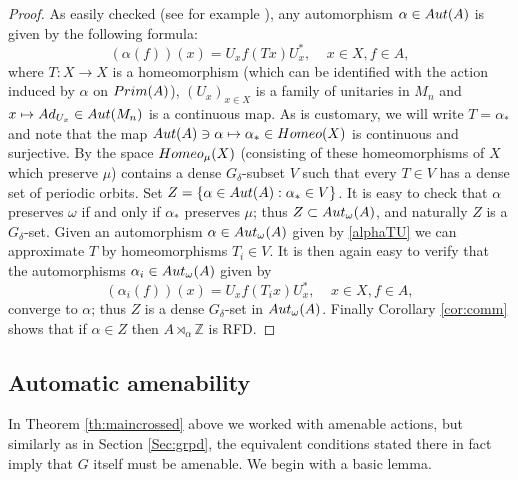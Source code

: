 \documentclass[11 pt, leqno, hidelinks]{amsart}%
\theoremstyle{plain}
\numberwithin{equation}{section}
\newcommand{\Z}{\mathbb{Z}}
\newcommand{\Prim}{\textup{Prim}}
\begin{document}
\begin{proof}
As easily checked (see for example \cite[Sections 4,5]{DanaIan}), any automorphism $\alpha \in \textup{Aut}(A)$ is given by the following formula:
 \begin{equation} \label{alphaTU} (\alpha(f)) (x)  = U_x f(Tx) U_x^*, \;\;\;\; x \in X, f \in A, \end{equation}
where $T:X \to X$ is a homeomorphism (which can be identified with the action induced by $\alpha$ on $\Prim(A)$), $(U_x)_{x\in X}$ is a family of unitaries in $M_n$  and $x \mapsto Ad_{U_x} \in \textup{Aut}(M_n)$ is a continuous map. As is customary, we will write $T= \alpha_*$ and note that the map $\textup{Aut}(A) \ni \alpha \mapsto \alpha_* \in \textup{Homeo}(X)$ is continuous and surjective. By \cite{DF} the space $\textup{Homeo}_\mu(X)$ (consisting of these homeomorphisms of $X$ which preserve $\mu$) contains a dense $G_\delta$-subset $V$ such that every $T\in V$ has a dense set of periodic orbits. Set $Z=\{\alpha \in \textup{Aut}(A): \alpha_*\in V\}$.
It is easy to check that $\alpha$ preserves $\omega$ if and only if $\alpha_*$ preserves $\mu$; thus $Z\subset \textup{Aut}_\omega(A)$, and naturally $Z$ is a $G_\delta$-set.   Given an automorphism $\alpha\in \textup{Aut}_\omega(A)$ given by  \eqref{alphaTU} we can approximate $T$ by homeomorphisms $T_i \in V$. It is then again easy to verify that the automorphisms $\alpha_i\in \textup{Aut}_\omega(A)$ given by
 \[(\alpha_i(f)) (x)  = U_x f(T_ix) U_x^*, \;\;\;\; x \in X, f \in A, \]
converge to $\alpha$; thus $Z$ is a dense $G_\delta$-set in  $\textup{Aut}_\omega(A)$. Finally Corollary \ref{cor:comm} shows that if $\alpha \in Z$ then
$A \rtimes_\alpha \Z$ is RFD.
\end{proof}



\subsection{Automatic amenability}



In Theorem \ref{th:maincrossed} above we worked with amenable actions, but similarly as in Section \ref{Sec:grpd}, the equivalent conditions stated there in fact imply that $G$ itself must be amenable.  We begin with a basic lemma.
\end{document}

